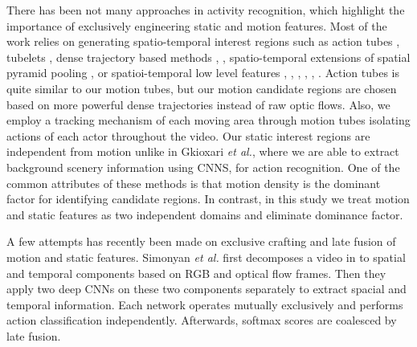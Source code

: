
There has been not many approaches in activity recognition, which highlight the
importance of exclusively engineering static and motion features. Most of the work
relies on generating spatio-temporal interest regions such as action tubes \cite{gkioxari2015finding},
tubelets \cite{jain2014action}, dense trajectory based methods \cite{van2015apt}, \cite{wang2015action},
spatio-temporal extensions of spatial pyramid pooling \cite{laptev2008learning},
or spatioi-temporal low level features  \cite{schuldt2004recognizing}, \cite{ke2005efficient}, \cite{shechtman2005space},
\cite{wang2011action}, \cite{klaser2008spatio}, \cite{yu2010real}. Action tubes \cite{gkioxari2015finding} is quite similar to
our motion tubes, but our motion candidate regions are chosen based on more powerful dense trajectories \cite{wang2011action} instead of
raw optic flows. Also, we employ a tracking mechanism of each moving area through motion tubes isolating actions
of each actor throughout the video. Our static interest regions are independent from motion
unlike in Gkioxari \textit{et al.}\cite{gkioxari2015finding}, where we are able to extract background scenery information using CNNS, for
action recognition.
One of the common attributes of these methods is that motion density is the
dominant factor for identifying candidate regions.
In contrast, in this study we treat motion and static features
as two independent domains and eliminate dominance factor.

A few attempts has recently been made on exclusive crafting and late fusion
of motion and static features. Simonyan \textit{et al.}\cite{simonyan2014two} first decomposes a video in to
spatial and temporal components based on RGB and optical flow frames.
Then they apply two deep CNNs on these two components separately to extract spacial and
temporal information. Each network operates mutually exclusively and performs action classification
independently. Afterwards, softmax scores are coalesced by late fusion.

